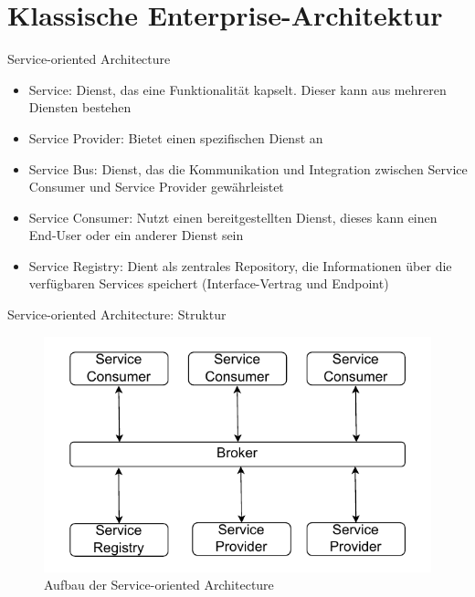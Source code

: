 \section{Klassische Enterprise-Architektur}


\begin{frame}{Service-oriented Architecture}
  \begin{itemize}
    \item Service: Dienst, das eine Funktionalität kapselt.
    Dieser kann aus mehreren Diensten bestehen
    \item Service Provider: Bietet einen spezifischen Dienst an
    \item Service Bus: Dienst, das die Kommunikation und Integration zwischen Service Consumer und Service Provider gewährleistet
    \item Service Consumer: Nutzt einen bereitgestellten Dienst, dieses kann einen End-User oder ein anderer Dienst sein
    \item Service Registry: Dient als zentrales Repository, die Informationen über die verfügbaren Services speichert (Interface-Vertrag und Endpoint)
  \end{itemize}
\end{frame}
\begin{frame}{Service-oriented Architecture: Struktur}
  \begin{figure}[!h]
    \centering
    \includegraphics[scale=0.55]{imglib/soa/soa}
    \caption{Aufbau der Service-oriented Architecture}
    \label{fig:soa}
  \end{figure}
\end{frame}

